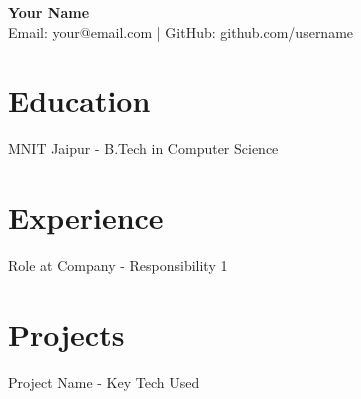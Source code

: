 \documentclass[a4paper,10pt]{article}
\begin{document}
\begin{center}
    {\huge \bf Your Name} \\
    Email: your@email.com | GitHub: github.com/username
\end{center}
\section*{Education}
MNIT Jaipur - B.Tech in Computer Science
\section*{Experience}
Role at Company - Responsibility 1
\section*{Projects}
Project Name - Key Tech Used
\end{document}

